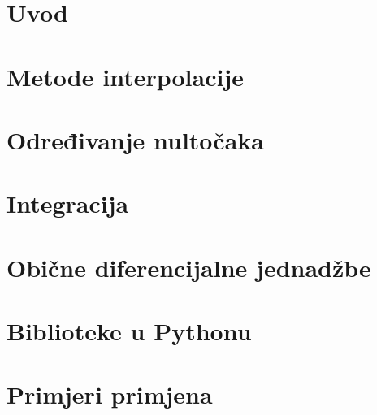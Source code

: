 \maketitle
\newpage
{}
\setcounter{page}{1}

\clearpage

\cleardoublepage
{}

\tableofcontents

\clearpage
{}

\chapter{Uvod}




\chapter{Metode interpolacije}









\chapter{Određivanje nultočaka}






\chapter{Integracija}





\chapter{Obične diferencijalne jednadžbe}



\clearpage
\begingroup
\setcounter{chapter}{8}
\begin{footnotesize}
\begin{multicols}{2}

\end{multicols}
\end{footnotesize}
\endgroup

\pagebreak
{}

\chapter{Biblioteke u Pythonu}


\chapter{Primjeri primjena}

